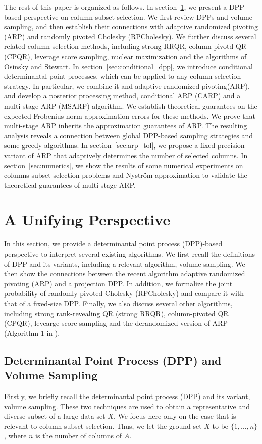\documentclass[11pt]{article}
\newcommand{\<}{\langle}
\renewcommand{\>}{\rangle}
\begin{document}
The rest of this paper is organized as follows. In section~\ref{sec:framework}, we present a DPP-based perspective on column subset selection. We first review DPPs and volume sampling, and then establish their connections with adaptive randomized pivoting (ARP) and randomly pivoted Cholesky (RPCholesky). We further discuss several related column selection methods, including strong RRQR, column pivotd QR (CPQR), leverage score sampling, nuclear maximization and the algorithms of Osinsky and Stewart. In section~\ref{sec:conditional_dpp}, we introduce conditional determinantal point processes, which can be applied to any column selection strategy. In particular, we combine it and adaptive randomized pivoting(ARP), and develop a posterior processing method, conditional ARP (CARP) and a multi-stage ARP (MSARP) algorithm. We establish theoretical guarantees on the expected Frobenius-norm approximation errors for these methods. We prove that multi-stage ARP inherits the approximation guarantees of ARP. The resulting analysis reveals a connection between global DPP-based sampling strategies and some greedy algorithms. In section~\ref{sec:arp_tol}, we propose a fixed-precision variant of ARP that adaptively determines the number of selected columns. In section~\ref{sec:numerics}, we show the results of some numerical experiments on columns subset selection problems and Nystr\"{o}m approximation to validate the theoretical guarantees of multi-stage ARP.

\section{A Unifying Perspective}
\label{sec:framework}
In this section, we provide a determinantal point process (DPP)-based perspective to interpret several existing algorithms. We first recall the definitions of DPP and its variants, including a relevant algorithm, volume sampling. We then show the connections between the recent algorithm adaptive randomized pivoting (ARP) and a projection DPP. In addition, we formalize the joint probability of randomly pivoted Cholesky (RPCholesky) and compare it with that of a fixed-size DPP. Finally, we also discuss several other algorithms, including strong rank-revealing QR (strong RRQR), column-pivoted QR (CPQR), levearge score sampling and the derandomized version of ARP (Algorithm 1 in \cite{OSINSKY2025359}). 
\subsection{Determinantal Point Process (DPP) and Volume Sampling}
Firstly, we briefly recall the determinantal point process (DPP) and its variant, volume sampling. These two techniques are used to obtain a representative and diverse subset of a large data set $X$. We focus here only on the case that is relevant to column subset selection. Thus, we let the ground set $X$ to be $\{1,\dots,n\}$, where $n$ is the number of columns of $A$.
\end{document}
